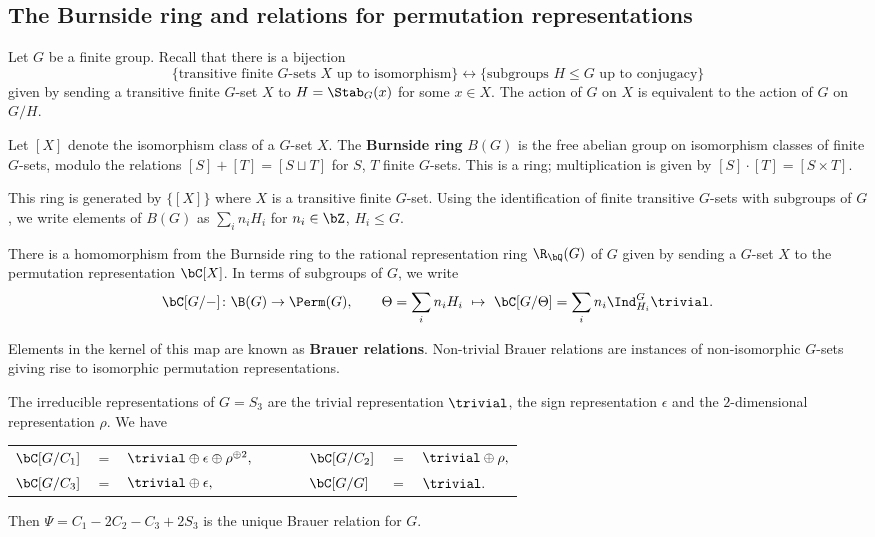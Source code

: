 \subsection{The Burnside ring and relations for permutation representations}

Let $G$ be a finite group. Recall that there is a bijection  
\[ \{ \text{transitive finite }G\text{-sets } X  \text{ up to isomorphism}\}\leftrightarrow  \{ \text{subgroups } H \leq G \text{ up to conjugacy} \} \] 
given by sending a transitive finite $G$-set $X$ to $H = \Stab_{G}(x)$ for some $x \in X$.  The action of $G$ on $X$ is equivalent to the action of $G$ on $G / H$. 

\begin{defn}
Let $[X]$ denote the isomorphism class of a $G$-set $X$. 
The \textbf{Burnside ring} $B(G)$ is the free abelian group on isomorphism classes of finite $G$-sets, modulo the relations  $[S] + [T] = [S \sqcup T]$ for $S$, $T$ finite $G$-sets. This is a ring; multiplication is given by $[S] \cdot [T] = [S \times T]$.
\end{defn}

This ring is generated by $\{ [X] \}$ where $X$ is a transitive finite $G$-set. Using the identification of finite transitive $G$-sets with subgroups of $G$, we write elements of $B(G)$ as $\sum_i n_i H_i$ for $n_i \in \bZ$, $H_i \leq G$. 

\begin{notn}
There is a homomorphism from the Burnside ring to the rational representation ring $\R_{\bQ}(G)$ of $G$ given by sending a $G$-set $X$ to the permutation representation $\bC[X]$. In terms of subgroups of $G$, we write
\[ \bC[G / -] \colon \B(G) \to \Perm(G),  \qquad \Theta = \sum_i n_i H_i \ \mapsto \ \bC[G / \Theta ] = \sum_i n_i \Ind_{H_i}^G \trivial. \]
\end{notn}
Elements in the kernel of this map are known as \textbf{Brauer relations}. Non-trivial Brauer relations are instances of non-isomorphic $G$-sets giving rise to isomorphic permutation representations. 

\begin{example}
    The irreducible representations of $G = S_3$ are the trivial representation $\trivial$, the sign representation $\epsilon$ and the $2$-dimensional representation $\rho$.
    We have
    \begin{table}[H]
        \centering
    \begin{tabular}{l l l l l l l}
        $\bC[G / C_1]$ & $=$ & $\trivial \oplus \epsilon \oplus \rho^{\oplus 2},$ & $\qquad$ &
        $\bC[G / C_2]$ & $=$ & $\trivial \oplus \rho,$\\ 
        $\bC[G / C_3]$ & $=$ & $\trivial \oplus \epsilon,$ & $\qquad$ &
        $\bC[G / G]$ & $=$ & $\trivial.$  
    \end{tabular}
\end{table}
    Then $\Psi = C_1  - 2 C_2 - C_3 + 2S_3$ is the unique Brauer relation for $G$.
\end{example}

